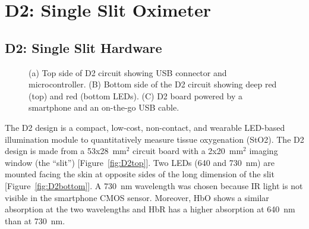 \section{D2: Single Slit Oximeter}
\subsection{D2: Single Slit Hardware}
\begin{figure}
    \begin{center}
    \end{center}
    \caption{(a) Top side of D2 circuit showing USB connector and microcontroller. (B) Bottom side of the D2 circuit showing deep red (top) and red (bottom LEDs). (C) D2 board powered by a smartphone and an on-the-go USB cable.} 
    \label{fig:D2hardware}
\end{figure} 
The D2 design is a compact, low-cost, non-contact, and wearable LED-based illumination module to quantitatively measure tissue oxygenation (StO2). The D2 design is made from a 53x28~mm$^2$ circuit board with a 2x20~mm$^2$ imaging window (the ``slit'') [Figure~\ref{fig:D2top}]. Two LEDs (640 and 730~nm) are mounted facing the skin at opposite sides of the long dimension of the slit [Figure~\ref{fig:D2bottom}]. A 730~nm wavelength was chosen because IR light is not visible in the smartphone CMOS sensor. Moreover, HbO shows a similar absorption at the two wavelengths and HbR has a higher absorption at 640~nm than at 730~nm. 

